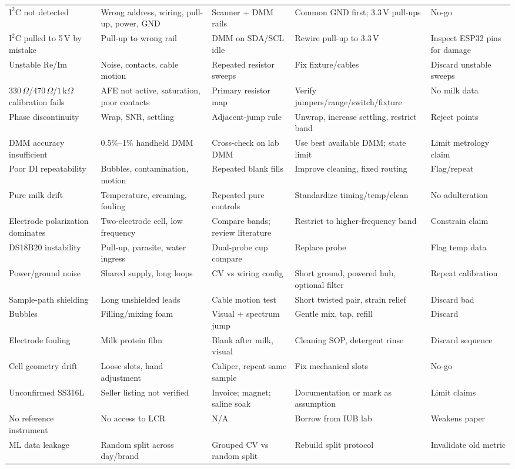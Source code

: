 \documentclass[11pt,a4paper]{article}
\newcommand{\kohm}[1]{\ensuremath{#1\,\mathrm{k}\Omega}}
\newcommand{\Rohm}[1]{\ensuremath{#1\,\Omega}}
\begin{document}
\begin{xltabular}{\textwidth}{L{26mm}L{31mm}L{29mm}L{31mm}L{18mm}}
$\mathrm{I^2C}$ not detected & Wrong address, wiring, pull-up, power, GND & Scanner + DMM rails & Common GND first; 3.3\,V pull-ups & No-go\\
$\mathrm{I^2C}$ pulled to 5\,V by mistake & Pull-up to wrong rail & DMM on SDA/SCL idle & Rewire pull-up to 3.3\,V & Inspect ESP32 pins for damage\\
Unstable Re/Im & Noise, contacts, cable motion & Repeated resistor sweeps & Fix fixture/cables & Discard unstable sweeps\\
\Rohm{330}/\Rohm{470}/\kohm{1} calibration fails & AFE not active, saturation, poor contacts & Primary resistor map & Verify jumpers/range/switch/fixture & No milk data\\
Phase discontinuity & Wrap, SNR, settling & Adjacent-jump rule & Unwrap, increase settling, restrict band & Reject points\\
DMM accuracy insufficient & 0.5\%--1\% handheld DMM & Cross-check on lab DMM & Use best available DMM; state limit & Limit metrology claim\\
Poor DI repeatability & Bubbles, contamination, motion & Repeated blank fills & Improve cleaning, fixed routing & Flag/repeat\\
Pure milk drift & Temperature, creaming, fouling & Repeated pure controls & Standardize timing/temp/clean & No adulteration\\
Electrode polarization dominates & Two-electrode cell, low frequency & Compare bands; review literature & Restrict to higher-frequency band & Constrain claim\\
DS18B20 instability & Pull-up, parasite, water ingress & Dual-probe cup compare & Replace probe & Flag temp data\\
Power/ground noise & Shared supply, long loops & CV vs wiring config & Short ground, powered hub, optional filter & Repeat calibration\\
Sample-path shielding & Long unshielded leads & Cable motion test & Short twisted pair, strain relief & Discard bad\\
Bubbles & Filling/mixing foam & Visual + spectrum jump & Gentle mix, tap, refill & Discard\\
Electrode fouling & Milk protein film & Blank after milk, visual & Cleaning SOP, detergent rinse & Discard sequence\\
Cell geometry drift & Loose slots, hand adjustment & Caliper, repeat same sample & Fix mechanical slots & No-go\\
Unconfirmed SS316L & Seller listing not verified & Invoice; magnet; saline soak & Documentation or mark as assumption & Limit claims\\
No reference instrument & No access to LCR & N/A & Borrow from IUB lab & Weakens paper\\
ML data leakage & Random split across day/brand & Grouped CV vs random split & Rebuild split protocol & Invalidate old metric\\
\bottomrule
\end{xltabular}
\normalsize
\end{document}

